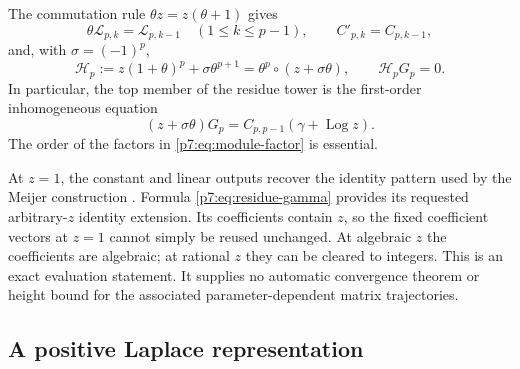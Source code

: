 \documentclass[11pt,a4paper]{article}
\theoremstyle{definition}
\theoremstyle{remark}
\DeclareMathOperator{\Log}{Log}
\numberwithin{equation}{section}
\begin{document}
The commutation rule $\theta z=z(\theta+1)$ gives
\[
 \theta\mathcal L_{p,k}=\mathcal L_{p,k-1}\quad(1\le k\le p-1),
 \qquad C'_{p,k}=C_{p,k-1},
\]
and, with $\sigma=(-1)^p$,
\begin{equation}
\label{p7:eq:module-factor}
 \mathcal H_p
 :=z(1+\theta)^p+\sigma\theta^{p+1}
 =\theta^p\circ(z+\sigma\theta),\qquad
 \mathcal H_pG_p=0.
\end{equation}
In particular, the top member of the residue tower is the first-order
inhomogeneous equation
\begin{equation}
\label{p7:eq:first-order}
 (z+\sigma\theta)G_p
 =C_{p,p-1}(\gamma+\Log z).
\end{equation}
The order of the factors in \eqref{p7:eq:module-factor} is essential.

At $z=1$, the constant and linear outputs recover the identity pattern
used by the Meijer construction \cite{p7:Kalisch2026}. Formula
\eqref{p7:eq:residue-gamma} provides its requested arbitrary-$z$ identity
extension. Its coefficients contain $z$, so the fixed coefficient
vectors at $z=1$ cannot simply be reused unchanged. At algebraic $z$ the
coefficients are algebraic; at rational $z$ they can be cleared to
integers. This is an exact evaluation statement. It supplies no
automatic convergence theorem or height bound for the associated
parameter-dependent matrix trajectories.

\subsection{A positive Laplace representation}
\end{document}
